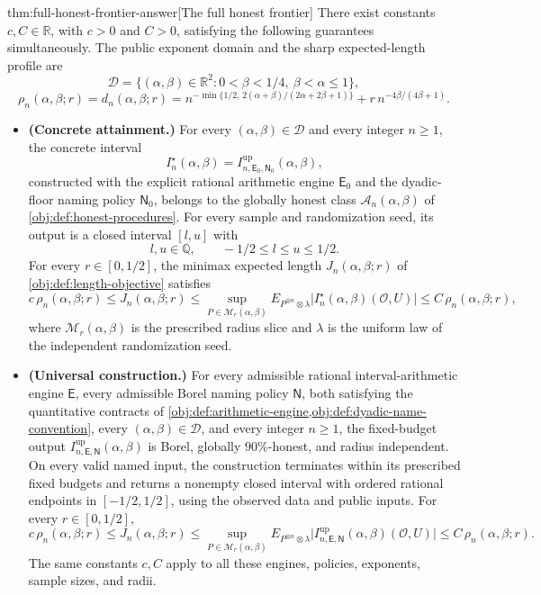 \documentclass[11pt]{article}
\begin{document}
\begin{theoremv}{thm:full-honest-frontier-answer}[The full honest frontier]
There exist constants \(c,C\in\mathbb R\), with \(c>0\) and \(C>0\), satisfying the following guarantees simultaneously. The public exponent domain and the sharp expected-length profile are
\[
\mathcal D=\{(\alpha,\beta)\in\mathbb R^2:0<\beta<1/4,\ \beta<\alpha\le1\},
\]
\[
\rho_n(\alpha,\beta;r)=d_n(\alpha,\beta;r)
=n^{-\min\{1/2,\,2(\alpha+\beta)/(2\alpha+2\beta+1)\}}
+r\,n^{-4\beta/(4\beta+1)}.
\]

\begin{itemize}
\item \textbf{(Concrete attainment.)}
For every \((\alpha,\beta)\in\mathcal D\) and every integer \(n\ge1\), the concrete interval
\[
I_n^\star(\alpha,\beta)
=I^{\mathrm{up}}_{n,\mathsf E_0,\mathsf N_0}(\alpha,\beta),
\]
constructed with the explicit rational arithmetic engine \(\mathsf E_0\) and the dyadic-floor naming policy \(\mathsf N_0\), belongs to the globally honest class \(\mathcal A_n(\alpha,\beta)\) of \cref{obj:def:honest-procedures}. For every sample and randomization seed, its output is a closed interval \([l,u]\) with
\[
l,u\in\mathbb Q,\qquad -1/2\le l\le u\le1/2.
\]
For every \(r\in[0,1/2]\), the minimax expected length \(J_n(\alpha,\beta;r)\) of \cref{obj:def:length-objective} satisfies
\[
c\,\rho_n(\alpha,\beta;r)
\le J_n(\alpha,\beta;r)
\le
\sup_{P\in\mathcal M_r(\alpha,\beta)}
E_{P^{\otimes n}\otimes\lambda}
\bigl|I_n^\star(\alpha,\beta)(\mathcal O,U)\bigr|
\le C\,\rho_n(\alpha,\beta;r),
\]
where \(\mathcal M_r(\alpha,\beta)\) is the prescribed radius slice and \(\lambda\) is the uniform law of the independent randomization seed.

\item \textbf{(Universal construction.)}
For every admissible rational interval-arithmetic engine \(\mathsf E\), every admissible Borel naming policy \(\mathsf N\), both satisfying the quantitative contracts of \cref{obj:def:arithmetic-engine,obj:def:dyadic-name-convention}, every \((\alpha,\beta)\in\mathcal D\), and every integer \(n\ge1\), the fixed-budget output
\(I^{\mathrm{up}}_{n,\mathsf E,\mathsf N}(\alpha,\beta)\)
is Borel, globally \(90\%\)-honest, and radius independent. On every valid named input, the construction terminates within its prescribed fixed budgets and returns a nonempty closed interval with ordered rational endpoints in \([-1/2,1/2]\), using the observed data and public inputs. For every \(r\in[0,1/2]\),
\[
c\,\rho_n(\alpha,\beta;r)
\le J_n(\alpha,\beta;r)
\le
\sup_{P\in\mathcal M_r(\alpha,\beta)}
E_{P^{\otimes n}\otimes\lambda}
\bigl|I^{\mathrm{up}}_{n,\mathsf E,\mathsf N}(\alpha,\beta)(\mathcal O,U)\bigr|
\le C\,\rho_n(\alpha,\beta;r).
\]
The same constants \(c,C\) apply to all these engines, policies, exponents, sample sizes, and radii.


\end{itemize}
\end{theoremv}
\end{document}

